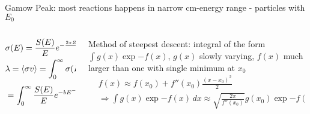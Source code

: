 \begin{frame}{Gamow Peak: most reactions happens in narrow cm-energy range - particles with $E_0$}
    \begin{columns}[T]
        \begin{column}{0.5\textwidth}
    \begin{align*}
        &\sigma(E)=\frac{S(E)}{E}e^{-\frac{2\pi Z_1Z_2e^2}{\hbar v}}=\frac{S(E)}{E}e^{-bE^{-\frac{1}{2}}}\\
        &\lambda=\langle \sigma v \rangle=\int_0^{\infty}\sigma(E)v(E)\psi(E)\,dE\\
        &=\int_0^{\infty}\frac{S(E)}{E}e^{-bE^{-\frac{1}{2}}}\sqrt{\frac{2E}{\mu}}\frac{2}{\sqrt{\pi}}\frac{E}{KT}e^{-\frac{E}{KT}}\frac{dE}{\sqrt{KTE}}
    \end{align*}    
        \end{column}
        \begin{column}{0.5\textwidth}
            Method of steepest descent: integral of the form $\int g(x)\exp{-f(x)}$, $g(x)$ slowly varying, $f(x)$ much larger than one with single minimum at $x_0$
            \begin{align*}
                &f(x)\approx f(x_0)+f''(x_0)\frac{(x-x_0)^2}{2}\tag{around minimum}\\
                &\Rightarrow\int g(x)\exp{-f(x)}\,dx\approx\sqrt{\frac{2\pi}{f''(x_0)}}g(x_0)\exp{-f(x_0)}
            \end{align*}
        \end{column}
    \end{columns}
    

\end{frame}
